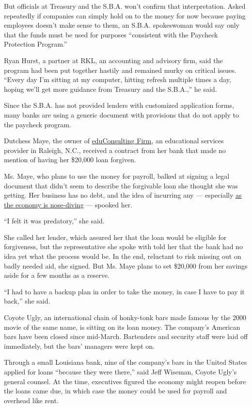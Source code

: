 But officials at Treasury and the S.B.A. won't confirm that
interpretation. Asked repeatedly if companies can simply hold on to the
money for now because paying employees doesn't make sense to them, an
S.B.A. spokeswoman would say only that the funds must be used for
purposes ``consistent with the Paycheck Protection Program.''

Ryan Hurst, a partner at RKL, an accounting and advisory firm, said the
program had been put together hastily and remained murky on critical
issues. ``Every day I'm sitting at my computer, hitting refresh multiple
times a day, hoping we'll get more guidance from Treasury and the
S.B.A.,'' he said.

Since the S.B.A. has not provided lenders with customized application
forms, many banks are using a generic document with provisions that do
not apply to the paycheck program.

Dutchess Maye, the owner of
\href{https://www.educonsultingfirm.com/}{eduConsulting Firm}, an
educational services provider in Raleigh, N.C., received a contract from
her bank that made no mention of having her \$20,000 loan forgiven.

Ms. Maye, who plans to use the money for payroll, balked at signing a
legal document that didn't seem to describe the forgivable loan she
thought she was getting. Her business has no debt, and the idea of
incurring any --- especially
\href{https://www.nytimes.com/2020/04/29/business/economy/us-gdp.html}{as
the economy is nose-diving} --- spooked her.

``I felt it was predatory,'' she said.

She called her lender, which assured her that the loan would be eligible
for forgiveness, but the representative she spoke with told her that the
bank had no idea yet what the process would be. In the end, reluctant to
risk missing out on badly needed aid, she signed. But Ms. Maye plans to
set \$20,000 from her savings aside for a few months as a reserve.

``I had to have a backup plan in order to take the money, in case I have
to pay it back,'' she said.

Coyote Ugly, an international chain of honky-tonk bars made famous by
the 2000 movie of the same name, is sitting on its loan money. The
company's American bars have been closed since mid-March. Bartenders and
security staff were laid off immediately, but the bars' managers were
kept on.

Through a small Louisiana bank, nine of the company's bars in the United
States applied for loans ``because they were there,'' said Jeff Wiseman,
Coyote Ugly's general counsel. At the time, executives figured the
economy might reopen before the loans came due, in which case the money
could be used for payroll and overhead like rent.

